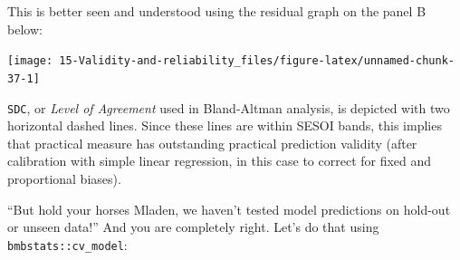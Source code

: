 \documentclass[
]{book}
\newenvironment{Shaded}{\begin{snugshade}}{\end{snugshade}}
\newcommand{\DataTypeTok}[1]{\textcolor[rgb]{0.13,0.29,0.53}{#1}}
\newcommand{\FloatTok}[1]{\textcolor[rgb]{0.00,0.00,0.81}{#1}}
\newcommand{\KeywordTok}[1]{\textcolor[rgb]{0.13,0.29,0.53}{\textbf{#1}}}
\newcommand{\NormalTok}[1]{#1}
\newcommand{\OperatorTok}[1]{\textcolor[rgb]{0.81,0.36,0.00}{\textbf{#1}}}
\newcommand{\StringTok}[1]{\textcolor[rgb]{0.31,0.60,0.02}{#1}}
\begin{document}
This is better seen and understood using the residual graph on the panel B below:

\begin{Shaded}
\end{Shaded}

\begin{center}\texttt{[image: 15-Validity-and-reliability\_files/figure-latex/unnamed-chunk-37-1]} \end{center}

\texttt{SDC}, or \emph{Level of Agreement} used in Bland-Altman analysis, is depicted with two horizontal dashed lines. Since these lines are within SESOI bands, this implies that practical measure has outstanding practical prediction validity (after calibration with simple linear regression, in this case to correct for fixed and proportional biases).

``But hold your horses Mladen, we haven't tested model predictions on hold-out or unseen data!'' And you are completely right. Let's do that using \texttt{bmbstats::cv\_model}:
\end{document}
